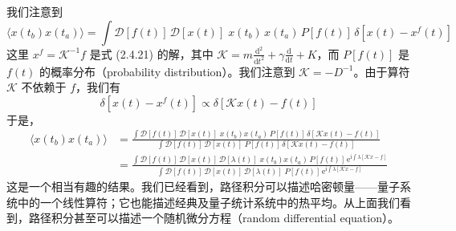 我们注意到
\begin{equation*}
\langle x(t_b)x(t_a)\rangle = \int \mathcal{D}[f(t)]\,\mathcal{D}[x(t)]\;x(t_b)\,x(t_a)\,P[f(t)]\,\delta[x(t) - x^f(t)]
\end{equation*}
这里 $x^f = \mathcal{K}^{-1}f$ 是式 (2.4.21) 的解，其中 $\mathcal{K} = m\frac{\mathrm{d}^2}{\mathrm{d}t^2} + \gamma\frac{\mathrm{d}}{\mathrm{d}t} + K$，而 $P[f(t)]$ 是 $f(t)$ 的概率分布（probability distribution）。我们注意到 $\mathcal{K} = -D^{-1}$。由于算符 $\mathcal{K}$ 不依赖于 $f$，我们有
\begin{equation*}
\delta[x(t) - x^f(t)] \propto \delta[\mathcal{K}x(t) - f(t)]
\end{equation*}
于是，
\begin{align*}
\langle x(t_b)x(t_a)\rangle &= \frac{\int \mathcal{D}[f(t)]\,\mathcal{D}[x(t)]\;x(t_b)x(t_a)\,P[f(t)]\,\delta[\mathcal{K}x(t) - f(t)]}{\int \mathcal{D}[f(t)]\,\mathcal{D}[x(t)]\;P[f(t)]\,\delta[\mathcal{K}x(t) - f(t)]}\\
&= \frac{\int \mathcal{D}[f(t)]\,\mathcal{D}[x(t)]\,\mathcal{D}[\lambda(t)]\;x(t_b)x(t_a)\,P[f(t)]\,\mathrm{e}^{\mathrm{i}\int \lambda[\mathcal{K}x - f]}}{\int \mathcal{D}[f(t)]\,\mathcal{D}[x(t)]\,\mathcal{D}[\lambda(t)]\;P[f(t)]\,\mathrm{e}^{\mathrm{i}\int \lambda[\mathcal{K}x - f]}}
\end{align*}
这是一个相当有趣的结果。我们已经看到，路径积分可以描述哈密顿量——量子系统中的一个线性算符；它也能描述经典及量子统计系统中的热平均。从上面我们看到，路径积分甚至可以描述一个随机微分方程（random differential equation）。

